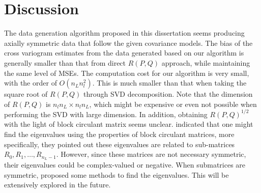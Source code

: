 \section{Discussion}
The data generation algorithm proposed in this dissertation seems producing axially symmetric data that follow the given covariance models. The bias of the cross variogram estimates from the data generated based on our algorithm is generally smaller than that from direct $R(P,Q)$ approach, while maintaining the same level of MSEs. The computation cost for our algorithm is very small, with the order of $O(n_L n_l^2)$. This is much smaller than that when taking the square root of $R(P,Q)$ through SVD decomposition. Note that the dimension of $R(P,Q)$ is $n_ln_L \times n_ln_L$, which might be expensive or even not possible when performing the SVD with large dimension. In addition, obtaining $R(P,Q)^{1/2}$ with the light of block circulant matrix seems unclear. \cite{Li2013} indicated that one might find the eigenvalues using the properties of block circulant matrices, more specifically, they pointed out these eigenvalues are related to sub-matrices $R_0, R_1, \ldots, R_{n_L-1}$. However, since these matrices are not necessary symmetric, their eigenvalues could be complex-valued or negative. When submatrices are symmetric, \cite{Tee2005} proposed some methods to find the eigenvalues. This will be extensively explored in the future.

